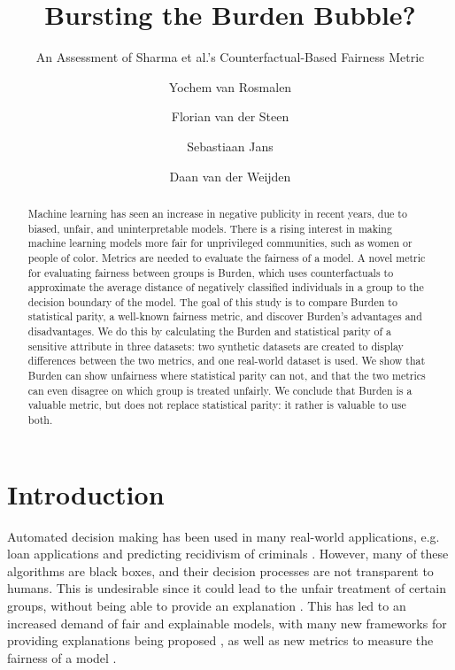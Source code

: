 \documentclass[runningheads]{llncs}
\begin{document}
\title{Bursting the Burden Bubble?}
\subtitle{An Assessment of Sharma et al.'s Counterfactual-Based Fairness Metric}

\author{
Yochem van Rosmalen
\and
Florian van der Steen
\and
Sebastiaan Jans
\and
Daan van der Weijden
}



\maketitle

\begin{abstract}
Machine learning has seen an increase in negative publicity in recent years, due to biased, unfair, and uninterpretable models. There is a rising interest in making machine learning models more fair for unprivileged communities, such as women or people of color. Metrics are needed to evaluate the fairness of a model. A novel metric for evaluating fairness between groups is Burden, which uses counterfactuals to approximate the average distance of negatively classified individuals in a group to the decision boundary of the model. The goal of this study is to compare Burden to statistical parity, a well-known fairness metric, and discover Burden's advantages and disadvantages. We do this by calculating the Burden and statistical parity of a sensitive attribute in three datasets: two synthetic datasets are created to display differences between the two metrics, and one real-world dataset is used. We show that Burden can show unfairness where statistical parity can not, and that the two metrics can even disagree on which group is treated unfairly. We conclude that Burden is a valuable metric, but does not replace statistical parity: it rather is valuable to use both.
\end{abstract}

\section{Introduction}

Automated decision making has been used in many real-world applications, e.g. loan applications and predicting recidivism of criminals \cite{loan,skeem}. However, many of these algorithms are black boxes, and their decision processes are not transparent to humans. This is undesirable since it could lead to the unfair treatment of certain groups, without being able to provide an explanation \cite{angwin2016machine}. This has led to an increased demand of fair and explainable models, with many new frameworks for providing explanations being proposed \cite{lundberg2017shap,ribeiro2016lime,ribeiro2018anchors}, as well as new metrics to measure the fairness of a model \cite{kamiran2009demographicparity,hardt2016equalisedodds,woodworth2017learning}.
\end{document}
